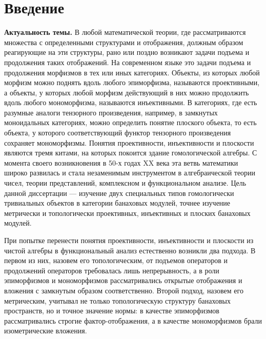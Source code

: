 \chapter*{Введение}

\textbf{Актуальность темы.} В любой математической теории, где рассматриваются
множества с определенными структурами и отображения, должным образом реагирующие
на эти структуры, рано или поздно возникают задачи подъема и продолжения таких
отображений. На современном языке это задачи подъема и продолжения морфизмов в
тех или иных категориях. Объекты, из которых любой морфизм можно поднять вдоль
любого эпиморфизма, называются проективными, а объекты, у которых любой морфизм
действующий в них можно продолжить вдоль любого мономорфизма, называются
инъективными. В категориях, где есть разумные аналоги тензорного произведения,
например, в замкнутых моноидальных категориях, можно определить понятие плоского
объекта, то есть объекта, у которого соответствующий функтор тензорного
произведения сохраняет мономорфизмы. Понятия проективности, инъективности и
плоскости являются тремя китами, на которых покоится здание гомологической
алгебры. С момента своего возникновения в 50-х годах XX века эта ветвь
математики широко развилась и стала незаменимым инструментом в алгебраической
теории чисел, теории представлений, комплексном и функциональном анализе. Цель
данной диссертации --- изучение двух специальных типов гомологически тривиальных
объектов в категории банаховых модулей, точнее изучение метрически и
топологически проективных, инъективных и плоских банаховых модулей.

При попытке перенести понятия проективности, инъективности и плоскости из чистой
алгебры в функциональный анализ естественно возникли два подхода. В первом из
них, назовем его топологическим, от подъемов операторов и продолжений операторов
требовалась лишь непрерывность, а в роли эпиморфизмов и мономорфизмов
рассматривались открытые отображения и вложения с замкнутым образом
соответственно. Второй подход, назовем его метрическим, учитывал не только
топологическую структуру банаховых пространств, но и точное значение нормы: в
качестве эпиморфизмов рассматривались строгие фактор-отображения, а в качестве
мономорфизмов брали изометрические вложения. 

